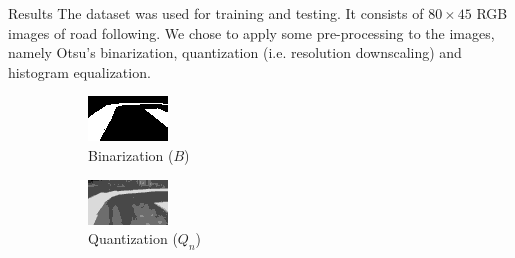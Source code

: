 \documentclass[final,hyperref={pdfpagelabels=false},notheorems]{beamer}
\theoremstyle{thesisstyle}
\newcommand{\pskip}{\vskip 0.5cm}
\begin{document}
\begin{frame}[t]
\begin{columns}[t]
\begin{column}{.5\textwidth}
    \begin{block}{Results}
      The \cite{self-driving} dataset was used for training and testing. It consists of $80\times
      45$ RGB images of road following. We chose to apply some pre-processing to the images, namely
      Otsu's binarization, quantization (i.e. resolution downscaling) and histogram
      equalization.\pskip
      \begin{figure}
        \begin{subfigure}{0.3\linewidth}
          \centering\includegraphics[width=\textwidth]{imgs/binary_up.png}
          \captionsetup{justification=centering}
          \caption*{Binarization ($B$)}
        \end{subfigure}
        \begin{subfigure}{0.3\linewidth}
          \centering\includegraphics[width=\textwidth]{imgs/trans_up.png}
          \captionsetup{justification=centering}
          \caption*{Quantization ($Q_n$)}
        \end{subfigure}
        \begin{subfigure}{0.3\linewidth}

\end{subfigure}
\end{figure}
\end{block}
\end{column}
\end{columns}
\end{frame}
\end{document}

